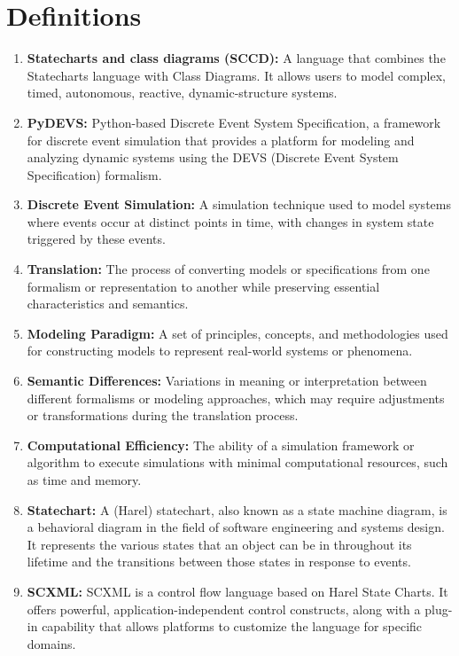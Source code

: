 \section{Definitions}
\begin{enumerate}
    \item \textbf{Statecharts and class diagrams (SCCD):} A language that combines the Statecharts language with Class Diagrams. It allows users to model complex, timed, autonomous, reactive, dynamic-structure systems.
    
    \item \textbf{PyDEVS:} Python-based Discrete Event System Specification, a framework for discrete event simulation that provides a platform for modeling and analyzing dynamic systems using the DEVS (Discrete Event System Specification) formalism.
            
    \item \textbf{Discrete Event Simulation:} A simulation technique used to model systems where events occur at distinct points in time, with changes in system state triggered by these events.
    
    \item \textbf{Translation:} The process of converting models or specifications from one formalism or representation to another while preserving essential characteristics and semantics.
    
    \item \textbf{Modeling Paradigm:} A set of principles, concepts, and methodologies used for constructing models to represent real-world systems or phenomena.
    
    \item \textbf{Semantic Differences:} Variations in meaning or interpretation between different formalisms or modeling approaches, which may require adjustments or transformations during the translation process.
    
    \item \textbf{Computational Efficiency:} The ability of a simulation framework or algorithm to execute simulations with minimal computational resources, such as time and memory.
    
    \item \textbf{Statechart:} A (Harel) statechart, also known as a state machine diagram, is a behavioral diagram in the field of software engineering and systems design. It represents the various states that an object can be in throughout its lifetime and the transitions between those states in response to events.

    \item \textbf{SCXML:} SCXML is a control flow language based on Harel State Charts. It offers powerful, application-independent control constructs, along with a plug-in capability that allows platforms to customize the language for specific domains.
  \end{enumerate}

